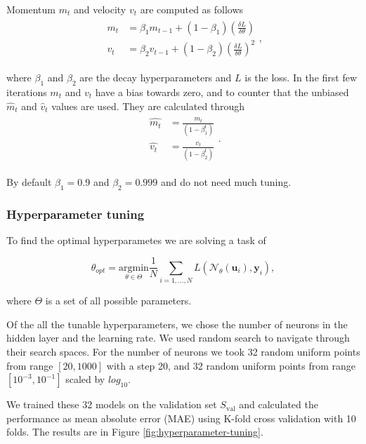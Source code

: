 Momentum ${m}_t$ and velocity ${v}_t$ are computed as follows
\begin{align}
    \begin{split}
        m_t &= \beta_1 m_{t-1} + (1 - \beta_1) (\frac{\delta L}{\delta \theta}) \\
        v_t &= \beta_2 v_{t-1} + (1 - \beta_2) (\frac{\delta L}{\delta \theta})^2
    \end{split},
\end{align}

where $\beta_1$ and $\beta_2$ are the decay hyperparameters and $L$ is the loss. In the first few iterations ${m}_t$ and ${v}_t$ have a bias towards zero, and to counter that the unbiased $\hat{m}_t$ and $\hat{v}_t$ values are used. They are calculated through \begin{align}
    \begin{split}
        \hat{m_t} &= \frac{m_t}{(1 - \beta_1^t)} \\
        \hat{v_t} &= \frac{v_t}{(1 - \beta_2^t)} 
    \end{split}.
\end{align}

By default $\beta_1 = 0.9$ and $\beta_2 = 0.999$ and do not need much tuning.

\subsubsection{Hyperparameter tuning}

To find the optimal hyperparametes we are solving a task of 

\begin{equation}
    \theta_{opt} = \underset{\theta \in \Theta}{\text{argmin}} \frac{1}{N} \sum_{i=1,\dots,N} L(\mathcal{N}_\theta(\textbf{u}_i), \textbf{y}_i),
\end{equation}

where $\Theta$ is a set of all possible parameters.

Of the all the tunable hyperparameters, we chose the number of neurons in the hidden layer and the learning rate. We used random search to navigate through their search spaces. For the number of neurons we took 32 random uniform points from range $[20, 1000]$ with a step 20, and 32 random uniform points from range $[10^{-3}, 10^{-1}]$ scaled by $log_{10}$.

We trained these 32 models on the validation set $S_{\text{val}}$ and calculated the performance as mean absolute error (MAE) using K-fold cross validation with 10 folds. The results are in Figure \ref{fig:hyperparameter-tuning}.

